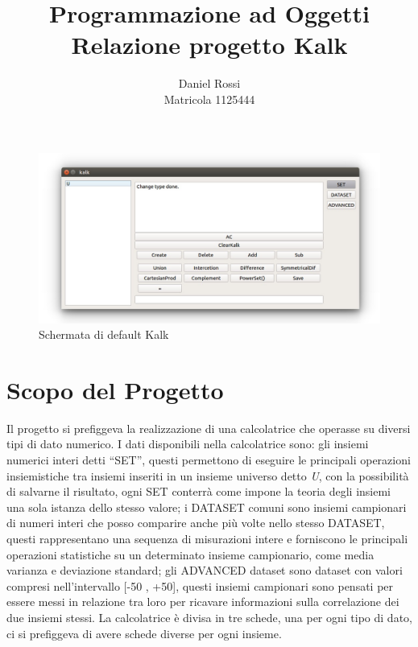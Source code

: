 \documentclass[a4paper,10pt]{article}
\begin{document}
	
	\title{Programmazione ad Oggetti\\Relazione progetto Kalk}
	\author{Daniel Rossi\\Matricola 1125444}
	\date{}
	\maketitle
	\begin{figure}[!h]
		\includegraphics[scale=0.5]{img/kalk.jpg}
			\caption{Schermata di default Kalk}
    \end{figure}
    \newpage
	\tableofcontents
	\newpage
	
	\section{Scopo del Progetto}
	Il progetto si prefiggeva la realizzazione di una calcolatrice che operasse su diversi tipi di dato numerico. I dati disponibili nella calcolatrice sono: gli insiemi numerici interi detti “SET”, questi permettono di eseguire le principali operazioni insiemistiche tra insiemi inseriti in un insieme universo detto \textit{U}, con la possibilità di salvarne il risultato, ogni SET conterrà come impone la teoria degli insiemi una sola istanza dello stesso valore; i DATASET comuni sono insiemi campionari di numeri interi che posso comparire anche più volte nello stesso DATASET, questi rappresentano una sequenza di misurazioni intere e forniscono le principali operazioni statistiche su un determinato insieme campionario, come media varianza e deviazione standard; gli ADVANCED dataset sono dataset con valori compresi nell’intervallo [-50 , +50], questi insiemi campionari sono pensati per essere messi in relazione tra loro per ricavare informazioni sulla correlazione dei due insiemi stessi. La calcolatrice è divisa in tre schede, una per ogni tipo di dato, ci si prefiggeva di avere schede diverse per ogni insieme.
\end{document}
